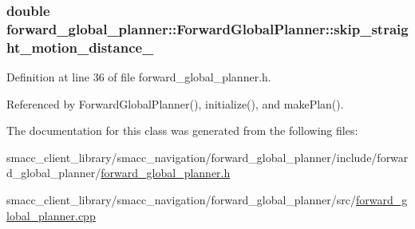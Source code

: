 \subsubsection[{\texorpdfstring{skip\+\_\+straight\+\_\+motion\+\_\+distance\+\_\+}{skip_straight_motion_distance_}}]{\setlength{\rightskip}{0pt plus 5cm}double forward\+\_\+global\+\_\+planner\+::\+Forward\+Global\+Planner\+::skip\+\_\+straight\+\_\+motion\+\_\+distance\+\_\+\hspace{0.3cm}{\ttfamily [private]}}\hypertarget{classforward__global__planner_1_1ForwardGlobalPlanner_a0e10cd64069d5723fbdb896fdcead82c}{}\label{classforward__global__planner_1_1ForwardGlobalPlanner_a0e10cd64069d5723fbdb896fdcead82c}


Definition at line 36 of file forward\+\_\+global\+\_\+planner.\+h.



Referenced by Forward\+Global\+Planner(), initialize(), and make\+Plan().



The documentation for this class was generated from the following files\+:\begin{DoxyCompactItemize}
\item 
smacc\+\_\+client\+\_\+library/smacc\+\_\+navigation/forward\+\_\+global\+\_\+planner/include/forward\+\_\+global\+\_\+planner/\hyperlink{forward__global__planner_8h}{forward\+\_\+global\+\_\+planner.\+h}\item 
smacc\+\_\+client\+\_\+library/smacc\+\_\+navigation/forward\+\_\+global\+\_\+planner/src/\hyperlink{forward__global__planner_8cpp}{forward\+\_\+global\+\_\+planner.\+cpp}\end{DoxyCompactItemize}
